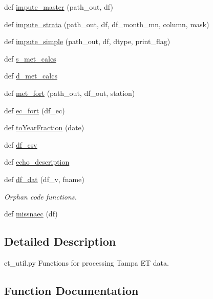 \begin{DoxyCompactItemize}
\item 
def \hyperlink{namespaceet__util_abf296bc00b589318395becdb4aa3f89d}{impute\+\_\+master} (path\+\_\+out, df)
\item 
def \hyperlink{namespaceet__util_ad991b40a8a99a7e5384f3bdfb1258af5}{impute\+\_\+strata} (path\+\_\+out, df, df\+\_\+month\+\_\+mn, column, mask)
\item 
def \hyperlink{namespaceet__util_ae6b0b0285532d32dd9d5d2b42c7f6043}{impute\+\_\+simple} (path\+\_\+out, df, dtype, print\+\_\+flag)
\item 
def \hyperlink{namespaceet__util_a28b3adad3d77922fccf7a1d77dd3adda}{s\+\_\+met\+\_\+calcs}
\item 
def \hyperlink{namespaceet__util_a45d34a2e8a980bed1bcf1c8d708399cc}{d\+\_\+met\+\_\+calcs}
\item 
def \hyperlink{namespaceet__util_a04161955cfa0207847c92471361582ae}{met\+\_\+fort} (path\+\_\+out, df\+\_\+out, station)
\item 
def \hyperlink{namespaceet__util_a4fd6a305cc0207763b1d2386f9eeac84}{ec\+\_\+fort} (df\+\_\+ec)
\item 
def \hyperlink{namespaceet__util_a8f87bce6dab1c42c9130fae0df312416}{to\+Year\+Fraction} (date)
\item 
def \hyperlink{namespaceet__util_a07507bce96a663ca49bd206aadc6272c}{df\+\_\+csv}
\item 
def \hyperlink{namespaceet__util_a15aa7ba554d08be6cbf6a674accfa16e}{echo\+\_\+description}
\item 
def \hyperlink{namespaceet__util_abbaa0589af07e21f8a1d98515aafef03}{df\+\_\+dat} (df\+\_\+v, fname)
\begin{DoxyCompactList}\small\item\em Orphan code functions. \end{DoxyCompactList}\item 
def \hyperlink{namespaceet__util_ad1b21b5159cbb574e683156c7870b06d}{missnaec} (df)
\end{DoxyCompactItemize}


\subsection{Detailed Description}
\begin{DoxyVerb}et_util.py
Functions for processing Tampa ET data.
\end{DoxyVerb}
 

\subsection{Function Documentation}
\hypertarget{namespaceet__util_a51bdba14dfab7dd5e7884cec009abde7}{}
